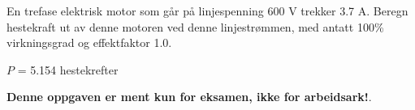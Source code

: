 

En trefase elektrisk motor som går på linjespenning 600 V trekker 3.7 A. Beregn hestekraft ut av denne motoren ved denne linjestrømmen, med antatt 100\% virkningsgrad og effektfaktor 1.0.







$P$ = 5.154 hestekrefter







{\bf Denne oppgaven er ment kun for eksamen, ikke for arbeidsark!}.


